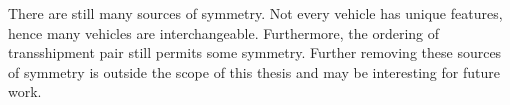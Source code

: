 There are still many sources of symmetry.
Not every vehicle has unique features, hence many vehicles are interchangeable.
Furthermore, the ordering of transshipment pair still permits some symmetry.
Further removing these  sources of symmetry is outside the scope of this thesis and may be interesting for future work.
%
%
%
%
%
%
%

%
%



